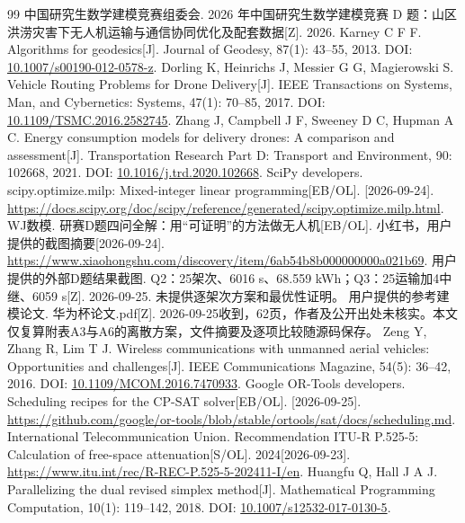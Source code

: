 \begin{thebibliography}{99}
 中国研究生数学建模竞赛组委会. 2026 年中国研究生数学建模竞赛 D 题：山区洪涝灾害下无人机运输与通信协同优化及配套数据[Z]. 2026.
 Karney C F F. Algorithms for geodesics[J]. Journal of Geodesy, 87(1): 43--55, 2013. DOI: \url{10.1007/s00190-012-0578-z}.
 Dorling K, Heinrichs J, Messier G G, Magierowski S. Vehicle Routing Problems for Drone Delivery[J]. IEEE Transactions on Systems, Man, and Cybernetics: Systems, 47(1): 70--85, 2017. DOI: \url{10.1109/TSMC.2016.2582745}.
 Zhang J, Campbell J F, Sweeney D C, Hupman A C. Energy consumption models for delivery drones: A comparison and assessment[J]. Transportation Research Part D: Transport and Environment, 90: 102668, 2021. DOI: \url{10.1016/j.trd.2020.102668}.
 SciPy developers. scipy.optimize.milp: Mixed-integer linear programming[EB/OL]. [2026-09-24]. \url{https://docs.scipy.org/doc/scipy/reference/generated/scipy.optimize.milp.html}.
 WJ数模. 研赛D题四问全解：用“可证明”的方法做无人机[EB/OL]. 小红书，用户提供的截图摘要[2026-09-24]. \url{https://www.xiaohongshu.com/discovery/item/6ab54b8b000000000a021b69}.
 用户提供的外部D题结果截图. Q2：25架次、6016 s、68.559 kWh；Q3：25运输加4中继、6059 s[Z]. 2026-09-25. 未提供逐架次方案和最优性证明。
 用户提供的参考建模论文. 华为杯论文.pdf[Z]. 2026-09-25收到，62页，作者及公开出处未核实。本文仅复算附表A3与A6的离散方案，文件摘要及逐项比较随源码保存。
 Zeng Y, Zhang R, Lim T J. Wireless communications with unmanned aerial vehicles: Opportunities and challenges[J]. IEEE Communications Magazine, 54(5): 36--42, 2016. DOI: \url{10.1109/MCOM.2016.7470933}.
 Google OR-Tools developers. Scheduling recipes for the CP-SAT solver[EB/OL]. [2026-09-25]. \url{https://github.com/google/or-tools/blob/stable/ortools/sat/docs/scheduling.md}.
 International Telecommunication Union. Recommendation ITU-R P.525-5: Calculation of free-space attenuation[S/OL]. 2024[2026-09-23]. \url{https://www.itu.int/rec/R-REC-P.525-5-202411-I/en}.
 Huangfu Q, Hall J A J. Parallelizing the dual revised simplex method[J]. Mathematical Programming Computation, 10(1): 119--142, 2018. DOI: \url{10.1007/s12532-017-0130-5}.
\end{thebibliography}
